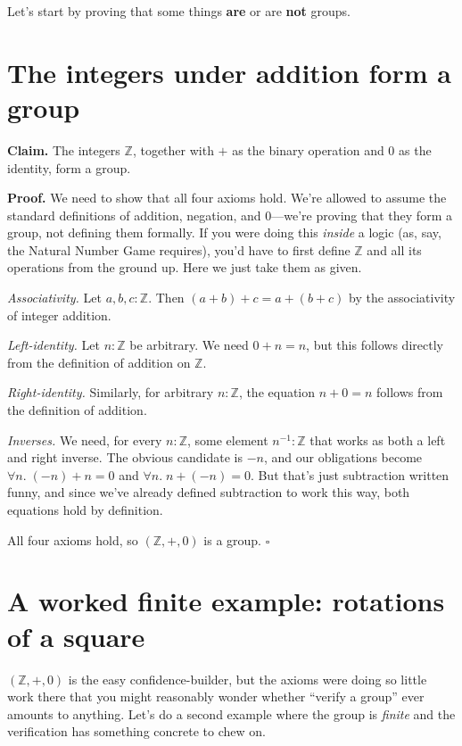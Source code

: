 \documentclass[11pt]{article}
\begin{document}
Let's start by proving that some things \textbf{are} or are \textbf{not} groups.

\section{The integers under addition form a group}
\textbf{Claim.} The integers $\mathbb{Z}$, together with $+$ as the binary operation and $0$ as the identity, form a group.

\textbf{Proof.} We need to show that all four axioms hold. We're allowed to assume the standard definitions of addition, negation, and $0$---we're proving that they form a group, not defining them formally. If you were doing this \emph{inside} a logic (as, say, the Natural Number Game requires), you'd have to first define $\mathbb{Z}$ and all its operations from the ground up. Here we just take them as given.

\emph{Associativity.} Let $a, b, c : \mathbb{Z}$. Then $(a + b) + c = a + (b + c)$ by the associativity of integer addition.

\emph{Left-identity.} Let $n : \mathbb{Z}$ be arbitrary. We need $0 + n = n$, but this follows directly from the definition of addition on $\mathbb{Z}$.

\emph{Right-identity.} Similarly, for arbitrary $n : \mathbb{Z}$, the equation $n + 0 = n$ follows from the definition of addition.

\emph{Inverses.} We need, for every $n : \mathbb{Z}$, some element $n^{-1} : \mathbb{Z}$ that works as both a left and right inverse. The obvious candidate is $-n$, and our obligations become $\forall n.\; (-n) + n = 0$ and $\forall n.\; n + (-n) = 0$. But that's just subtraction written funny, and since we've already defined subtraction to work this way, both equations hold by definition.

All four axioms hold, so $(\mathbb{Z}, +, 0)$ is a group. \hfill $\square$

\section{A worked finite example: rotations of a square}

$(\mathbb{Z}, +, 0)$ is the easy confidence-builder, but the axioms were doing so little work there that you might reasonably wonder whether ``verify a group'' ever amounts to anything. Let's do a second example where the group is \emph{finite} and the verification has something concrete to chew on.
\end{document}
